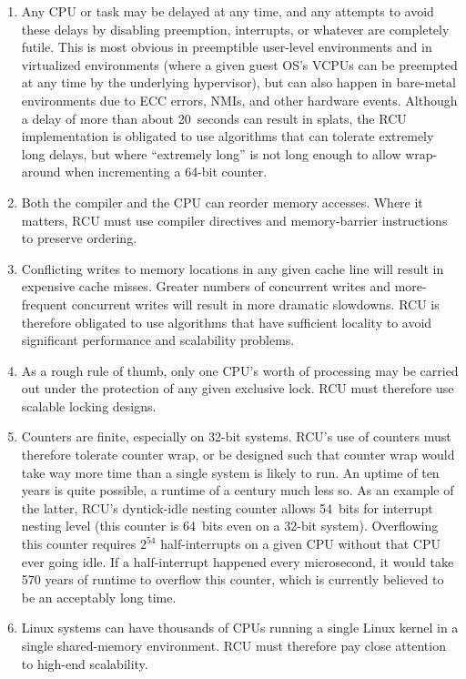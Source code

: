 \begin{enumerate}
\item Any CPU or task may be delayed at any time, and any attempts to avoid
   these delays by disabling preemption, interrupts, or whatever are
   completely futile.
   This is most obvious in preemptible user-level
   environments and in virtualized environments (where a given guest
   OS's VCPUs can be preempted at any time by the underlying
   hypervisor), but can also happen in bare-metal environments due to
   ECC errors, NMIs, and other hardware events.
   Although a delay of more
   than about 20~seconds can result in splats, the RCU implementation is
   obligated to use algorithms that can tolerate extremely long delays,
   but where ``extremely long'' is not long enough to allow wrap-around
   when incrementing a 64-bit counter.
\item Both the compiler and the CPU can reorder memory accesses.
   Where it
   matters, RCU must use compiler directives and memory-barrier
   instructions to preserve ordering.
\item Conflicting writes to memory locations in any given cache line will
   result in expensive cache misses.
   Greater numbers of concurrent
   writes and more-frequent concurrent writes will result in more
   dramatic slowdowns.
   RCU is therefore obligated to use algorithms that
   have sufficient locality to avoid significant performance and
   scalability problems.
\item As a rough rule of thumb, only one CPU's worth of processing may be
   carried out under the protection of any given exclusive lock.
   RCU
   must therefore use scalable locking designs.
\item Counters are finite, especially on 32-bit systems.
   RCU's use of
   counters must therefore tolerate counter wrap, or be designed such
   that counter wrap would take way more time than a single system is
   likely to run.
   An uptime of ten years is quite possible, a runtime of
   a century much less so.
   As an example of the latter, RCU's
   dyntick-idle nesting counter allows 54~bits for interrupt nesting
   level (this counter is 64~bits even on a 32-bit system).
   Overflowing
   this counter requires $2^54$ half-interrupts on a given CPU
   without that CPU ever going idle.
   If a half-interrupt happened every
   microsecond, it would take 570 years of runtime to overflow this
   counter, which is currently believed to be an acceptably long time.
\item Linux systems can have thousands of CPUs running a single Linux
   kernel in a single shared-memory environment.
   RCU must therefore pay
   close attention to high-end scalability.
\end{enumerate}

